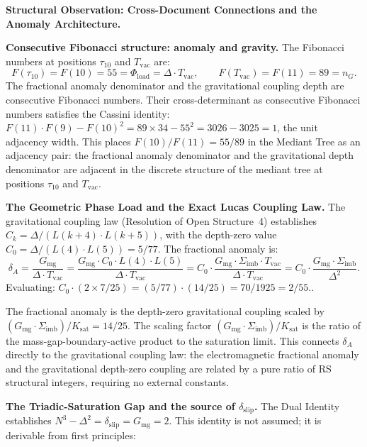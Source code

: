 \documentclass[11pt, letterpaper]{article}
\theoremstyle{definition}
\theoremstyle{plain}
\begin{document}
\begin{observebox}
\textbf{Structural Observation: Cross-Document Connections and the Anomaly Architecture.}

\noindent\textbf{Consecutive Fibonacci structure: anomaly and gravity.}
The Fibonacci numbers at positions $\tau_{10}$ and $T_\mathrm{vac}$ are:
\[
    F(\tau_{10}) = F(10) = 55 = \Phi_\mathrm{load} = \Delta \cdot T_\mathrm{vac},
    \qquad
    F(T_\mathrm{vac}) = F(11) = 89 = n_G.
\]
The fractional anomaly denominator and the gravitational coupling depth are
consecutive Fibonacci numbers. Their cross-determinant as consecutive Fibonacci
numbers satisfies the Cassini identity:
$F(11) \cdot F(9) - F(10)^2 = 89 \times 34 - 55^2 = 3026 - 3025 = 1$,
the unit adjacency width. This places $F(10)/F(11) = 55/89$ in the Mediant Tree
as an adjacency pair: the fractional anomaly denominator and the gravitational
depth denominator are adjacent in the discrete structure of the mediant tree at
positions $\tau_{10}$ and $T_\mathrm{vac}$.

\noindent\textbf{The Geometric Phase Load and the Exact Lucas Coupling Law.}
The gravitational coupling law (Resolution of Open Structure~4) establishes
$C_k = \Delta/(L(k+4) \cdot L(k+5))$, with the depth-zero value
$C_0 = \Delta/(L(4) \cdot L(5)) = 5/77$. The fractional anomaly is:
\[
    \delta_A = \frac{G_\mathrm{mg}}{\Delta \cdot T_\mathrm{vac}}
             = \frac{G_\mathrm{mg} \cdot C_0 \cdot L(4) \cdot L(5)}{\Delta \cdot T_\mathrm{vac}}
             = C_0 \cdot \frac{G_\mathrm{mg} \cdot \Sigma_\mathrm{imb} \cdot T_\mathrm{vac}}
                                  {\Delta \cdot T_\mathrm{vac}}
             = C_0 \cdot \frac{G_\mathrm{mg} \cdot \Sigma_\mathrm{imb}}{\Delta^2}.
\]
Evaluating: $C_0 \cdot (2 \times 7/25) = (5/77) \cdot (14/25) = 70/1925 = 2/55$..

The fractional anomaly is the depth-zero gravitational coupling scaled by
$(G_\mathrm{mg} \cdot \Sigma_\mathrm{imb}) / K_\mathrm{sat} = 14/25$. The scaling
factor $(G_\mathrm{mg} \cdot \Sigma_\mathrm{imb}) / K_\mathrm{sat}$ is the ratio of the
mass-gap-boundary-active product to the saturation limit. This connects $\delta_A$
directly to the gravitational coupling law: the electromagnetic fractional anomaly
and the gravitational depth-zero coupling are related by a pure ratio of RS structural
integers, requiring no external constants.

\noindent\textbf{The Triadic-Saturation Gap and the source of $\delta_\mathrm{slip}$.}
The Dual Identity establishes $N^3 - \Delta^2 = \delta_\mathrm{slip} = G_\mathrm{mg} = 2$.
This identity is not assumed; it is derivable from first principles:


\end{observebox}
\end{document}
